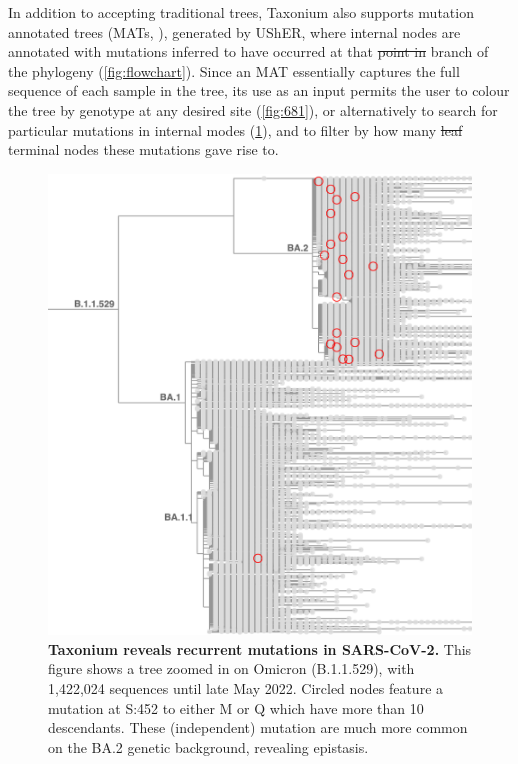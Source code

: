 \documentclass[twocolumn]{bioRxiv}
\providecommand{\DIFadd}[1]{{\protect\color{teal}#1}}
\providecommand{\DIFdel}[1]{{\protect\color{red}\sout{#1}}}
\providecommand{\DIFaddbegin}{}
\providecommand{\DIFaddend}{}
\providecommand{\DIFdelbegin}{}
\providecommand{\DIFdelend}{}
\begin{document}
In addition to accepting traditional trees, Taxonium also supports mutation annotated trees (MATs, \citet{matutils}), generated by UShER, where internal nodes are annotated with mutations inferred to have occurred at that \DIFdelbegin \DIFdel{point in }\DIFdelend \DIFaddbegin \DIFadd{branch of }\DIFaddend the phylogeny (\cref{fig:flowchart}). Since an MAT essentially captures the full sequence of each sample in the tree, its use as an input permits the user to colour the tree by genotype at any desired site (\cref{fig:681}), or alternatively to search for particular mutations in internal modes (\cref{fig:452}), and to filter by how many \DIFdelbegin \DIFdel{leaf }\DIFdelend \DIFaddbegin \DIFadd{terminal }\DIFaddend nodes these mutations gave rise to.



\begin{figure}
\begin{center}
\includegraphics[width=\linewidth]{Figures/452_2.png}
\end{center}
\caption{\textbf{Taxonium reveals recurrent mutations in SARS-CoV-2.} This figure shows a tree zoomed in on Omicron (B.1.1.529), with 1,422,024 sequences until late May 2022. Circled nodes feature a mutation at S:452 to either M or Q which have more than 10 descendants. These (independent) mutation are much more common on the BA.2 genetic background, revealing epistasis.}
\label{fig:452}
\end{figure}
\end{document}
